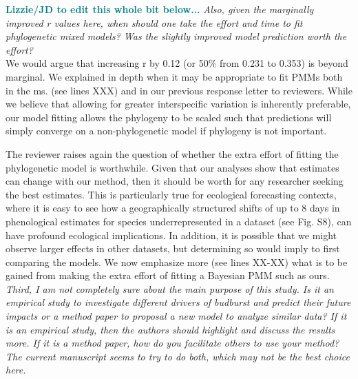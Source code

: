 \documentclass[11pt]{article}
\begin{document}
\textcolor{teal}{{\bf Lizzie/JD to edit this whole bit below...}}
\emph{Also, given the marginally improved r values here, when should one take the effort and time to fit phylogenetic mixed models? Was the slightly improved model prediction worth the effort?}\\


We would argue that increasing r by 0.12 (or 50\% from 0.231 to 0.353) is beyond marginal. We explained in depth when it may be appropriate to fit PMMs both in the ms. (see lines XXX) and in our previous response letter to reviewers. While we believe that allowing for greater interspecific variation is inherently preferable, our model fitting allows the phylogeny to be scaled such that predictions will simply converge on a non-phylogenetic model if phylogeny is not important. 

The reviewer raises again the question of whether the extra effort of fitting the phylogenetic model is worthwhile. Given that our analyses show that estimates can change with our method, then it should be worth for any researcher seeking the best estimates. This is particularly true for ecological forecasting contexts, where it is easy to see how a geographically structured shifts of up to 8 days in phenological estimates for species underrepresented in a dataset (see Fig. S8), can have profound ecological implications. In addition, it is possible that we might observe larger effects in other datasets, but determining so would imply to first comparing the models. We now emphasize more (see lines XX-XX) what is to be gained from making the extra effort of fitting a Bayesian PMM such as ours.\\

\emph{Third, I am not completely sure about the main purpose of this study. Is it an empirical study to investigate different drivers of budburst and predict their future impacts or a method paper to proposal a new model to analyze similar data? If it is an empirical study, then the authors should highlight and discuss the results more. If it is a method paper, how do you facilitate others to use your method? The current manuscript seems to try to do both, which may not be the best choice here.}\\
\end{document}
